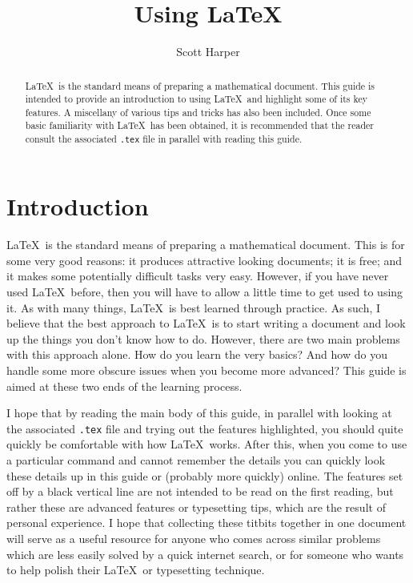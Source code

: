 \documentclass[11pt]{article}
\title{\textbf{Using \LaTeX}}
\author{Scott Harper}
\date{}
\theoremstyle{definition}
\theoremstyle{plain}
\begin{document}
\maketitle

\begin{abstract}
\LaTeX\ is the standard means of preparing a mathematical document. This guide is intended to provide an introduction to using \LaTeX\ and highlight some of its key features. A miscellany of various tips and tricks has also been included. Once some basic familiarity with \LaTeX\ has been obtained, it is recommended that the reader consult the associated \texttt{.tex} file in parallel with reading this guide.
\end{abstract}


\section{Introduction} \label{sec:intro}
\LaTeX\ is the standard means of preparing a mathematical document. This is for some very good reasons: it produces attractive looking documents; it is free; and it makes some potentially difficult tasks very easy. However, if you have never used \LaTeX\ before, then you will have to allow a little time to get used to using it. As with many things, \LaTeX\ is best learned through practice. As such, I believe that the best approach to \LaTeX\ is to start writing a document and look up the things you don't know how to do. However, there are two main problems with this approach alone. How do you learn the very basics? And how do you handle some more obscure issues when you become more advanced? This guide is aimed at these two ends of the learning process. 

I hope that by reading the main body of this guide, in parallel with looking at the associated \texttt{.tex} file and trying out the features highlighted, you should quite quickly be comfortable with how \LaTeX\ works. After this, when you come to use a particular command and cannot remember the details you can quickly look these details up in this guide or (probably more quickly) online. The features set off by a black vertical line are not intended to be read on the first reading, but rather these are advanced features or typesetting tips, which are the result of personal experience. I hope that collecting these titbits together in one document will serve as a useful resource for anyone who comes across similar problems which are less easily solved by a quick internet search, or for someone who wants to help polish their \LaTeX\ or typesetting technique.
\end{document}
